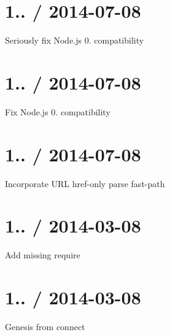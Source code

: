 \section*{1.. / 2014-\/07-\/08 }


\begin{DoxyItemize}
\item Seriously fix Node.\+js 0. compatibility
\end{DoxyItemize}

\section*{1.. / 2014-\/07-\/08 }


\begin{DoxyItemize}
\item Fix Node.\+js 0. compatibility
\end{DoxyItemize}

\section*{1.. / 2014-\/07-\/08 }


\begin{DoxyItemize}
\item Incorporate U\+RL href-\/only parse fast-\/path
\end{DoxyItemize}

\section*{1.. / 2014-\/03-\/08 }


\begin{DoxyItemize}
\item Add missing {\ttfamily require}
\end{DoxyItemize}

\section*{1.. / 2014-\/03-\/08 }


\begin{DoxyItemize}
\item Genesis from {\ttfamily connect} 
\end{DoxyItemize}